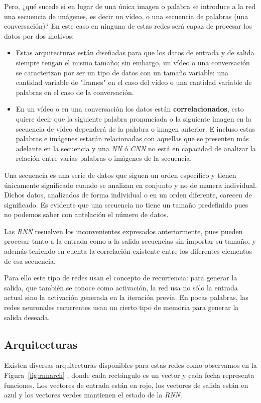 \documentclass[a4paper,12pt]{article}
\begin{document}
Pero, ¿qué sucede si en lugar de una única imagen o palabra se introduce a la red una secuencia de imágenes, es decir un vídeo, o una secuencia de palabras (una conversación)? En este caso en ninguna de estas redes será capaz de procesar los datos por dos motivos:
\begin{itemize}
	\item Estas arquitecturas están diseñadas para que los datos de entrada y de salida siempre tengan el mismo tamaño; sin embargo, un vídeo o una conversación se caracterizan por ser un tipo de datos con un tamaño variable: una cantidad variable de "frames"
en el caso del vídeo o una cantidad variable de palabras en el caso de la conversación. 
	\item En un vídeo o en una conversación los datos están \textbf{correlacionados}, esto quiere decir que la siguiente palabra pronunciada o la siguiente imagen en la secuencia de vídeo dependerá de la palabra o imagen anterior. E incluso estas palabras e imágenes estarán relacionadas con aquellas que se presenten más adelante en la secuencia y una \textit{NN} ó \textit{CNN} no está en capacidad de analizar la relación entre varias palabras o imágenes de la secuencia.
\end{itemize}

Una secuencia es una serie de datos que siguen un orden específico y tienen únicamente significado cuando se analizan en conjunto y no de manera individual. Dichos datos, analizados de forma individual o en un orden diferente, carecen de significado. Es evidente que una secuencia no tiene un tamaño predefinido pues no podemos saber con antelación el número de datos. 

Las \textit{RNN} resuelven los inconvenientes expresados anteriormente, pues pueden procesar tanto a la entrada como a la salida secuencias sin importar su tamaño, y además teniendo en cuenta la correlación existente entre los diferentes elementos de esa secuencia.

Para ello este tipo de redes usan el concepto de recurrencia: para generar la salida, que también se conoce como activación, la red usa no sólo la entrada actual sino la activación generada en la iteración previa. En pocas palabras, las redes neuronales recurrentes usan un cierto tipo de memoria para generar la salida deseada. 

\subsection{Arquitecturas} \label{rnnarchitecture}
Existen diversas arquitecturas disponibles para estas redes como observamos en la Figura~\ref{fig:rnnarch} \cite{karpathy:rnn}, donde cada rectángulo es un vector y cada fecha representa funciones. Los vectores de entrada están en rojo, los vectores de salida están en azul y los vectores verdes mantienen el estado de la \textit{RNN}.
\end{document}
